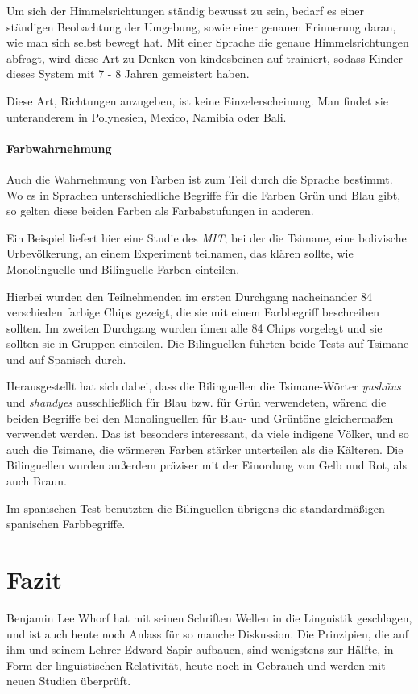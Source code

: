 \documentclass[12pt]{scrreprt}
\begin{document}
		Um sich der Himmelsrichtungen ständig bewusst zu sein, bedarf es einer ständigen
		Beobachtung der Umgebung, sowie einer genauen Erinnerung daran, wie man sich
		selbst bewegt hat. Mit einer Sprache die genaue Himmelsrichtungen abfragt,
		wird diese Art zu Denken von kindesbeinen auf trainiert, sodass Kinder dieses
		System mit 7 - 8 Jahren gemeistert haben.

		Diese Art, Richtungen anzugeben, ist keine Einzelerscheinung. Man findet sie
		unteranderem in Polynesien, Mexico, Namibia oder Bali.\autocite{article:Linguistic_Relativity}
		\newpage
		\subsubsection{Farbwahrnehmung}
		\label{sec:sawo_farbw}
		Auch die Wahrnehmung von Farben ist zum Teil durch die Sprache bestimmt.
		Wo es in Sprachen unterschiedliche Begriffe für die Farben Grün und Blau gibt,
		so gelten diese beiden Farben als Farbabstufungen in anderen.

		Ein Beispiel liefert hier eine Studie des \textit{MIT}, bei der die Tsimane, eine
		bolivische Urbevölkerung, an einem Experiment teilnamen, das klären sollte,
		wie Monolinguelle und Bilinguelle Farben einteilen.

		Hierbei wurden den Teilnehmenden im ersten Durchgang nacheinander 84
		verschieden farbige Chips gezeigt, die sie mit einem Farbbegriff beschreiben
		sollten.
		Im zweiten Durchgang wurden ihnen alle 84 Chips vorgelegt und sie sollten
		sie in Gruppen einteilen. Die Bilinguellen führten beide Tests auf Tsimane
		und auf Spanisch durch.

		Herausgestellt hat sich dabei, dass die Bilinguellen die Tsimane-Wörter
		\textit{yushñus} und \textit{shandyes} ausschließlich für Blau bzw. für Grün
		verwendeten, wärend die beiden Begriffe bei den Monolinguellen für Blau- und
		Grüntöne gleichermaßen verwendet werden.
		Das ist besonders interessant, da viele indigene Völker, und so auch die
		Tsimane, die wärmeren Farben stärker unterteilen als die Kälteren.
		Die Bilinguellen wurden außerdem präziser mit der Einordung von Gelb und Rot,
		als auch Braun.

		Im spanischen Test benutzten die Bilinguellen übrigens die standardmäßigen
		spanischen Farbbegriffe.\autocite{article:Color_Perception}

\chapter{Fazit}
\label{chap:fazit}
Benjamin Lee Whorf hat mit seinen Schriften Wellen in die Linguistik geschlagen,
und ist auch heute noch Anlass für so manche Diskussion. Die Prinzipien, die
auf ihm und seinem Lehrer Edward Sapir aufbauen, sind wenigstens zur Hälfte,
in Form der linguistischen Relativität, heute noch in Gebrauch und werden mit
neuen Studien überprüft.
\end{document}
